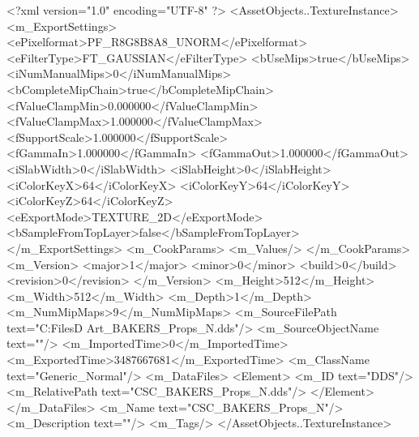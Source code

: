 <?xml version="1.0" encoding="UTF-8" ?>
<AssetObjects..TextureInstance>
	<m_ExportSettings>
		<ePixelformat>PF_R8G8B8A8_UNORM</ePixelformat>
		<eFilterType>FT_GAUSSIAN</eFilterType>
		<bUseMips>true</bUseMips>
		<iNumManualMips>0</iNumManualMips>
		<bCompleteMipChain>true</bCompleteMipChain>
		<fValueClampMin>0.000000</fValueClampMin>
		<fValueClampMax>1.000000</fValueClampMax>
		<fSupportScale>1.000000</fSupportScale>
		<fGammaIn>1.000000</fGammaIn>
		<fGammaOut>1.000000</fGammaOut>
		<iSlabWidth>0</iSlabWidth>
		<iSlabHeight>0</iSlabHeight>
		<iColorKeyX>64</iColorKeyX>
		<iColorKeyY>64</iColorKeyY>
		<iColorKeyZ>64</iColorKeyZ>
		<eExportMode>TEXTURE_2D</eExportMode>
		<bSampleFromTopLayer>false</bSampleFromTopLayer>
	</m_ExportSettings>
	<m_CookParams>
		<m_Values/>
	</m_CookParams>
	<m_Version>
		<major>1</major>
		<minor>0</minor>
		<build>0</build>
		<revision>0</revision>
	</m_Version>
	<m_Height>512</m_Height>
	<m_Width>512</m_Width>
	<m_Depth>1</m_Depth>
	<m_NumMipMaps>9</m_NumMipMaps>
	<m_SourceFilePath text="C:\Users\Shadow\Desktop\Working Files\3D Art\Props\Bakers\CSC_BAKERS_Props_N.dds"/>
	<m_SourceObjectName text=""/>
	<m_ImportedTime>0</m_ImportedTime>
	<m_ExportedTime>3487667681</m_ExportedTime>
	<m_ClassName text="Generic_Normal"/>
	<m_DataFiles>
		<Element>
			<m_ID text="DDS"/>
			<m_RelativePath text="CSC_BAKERS_Props_N.dds"/>
		</Element>
	</m_DataFiles>
	<m_Name text="CSC_BAKERS_Props_N"/>
	<m_Description text=""/>
	<m_Tags/>
</AssetObjects..TextureInstance>

